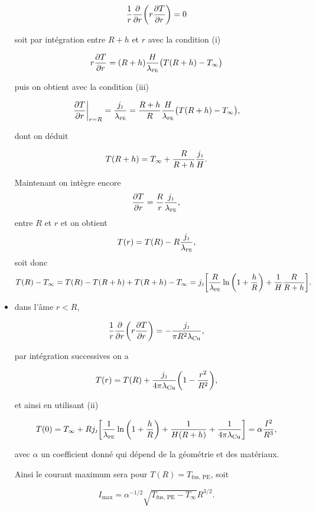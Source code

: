 \begin{solution}
\begin{questions}
\begin{itemize}
        $$\dfrac{1}{r}\pdv{r}\qty(r\pdv{T}{r}) = 0$$
        
        soit par intégration entre $R + h$ et $r$ avec la condition (i)
        
        $$r\pdv{T}{r} = (R + h) \dfrac{H}{\lambda_\textsc{pe}}\qty\big(T(R+h) - T_\infty)$$
        
        puis on obtient avec la condition (iii)
        
        $$\eval{\pdv{T}{r}}_{r = R} = \dfrac{j_\textsc{j}}{\lambda_\textsc{pe}} = \dfrac{R + h}{R} \dfrac{H}{\lambda_\textsc{pe}}\qty\big(T(R+h) - T_\infty),$$
        
        dont on déduit
        
        $$T(R+h) = T_\infty + \dfrac{R}{R + h}\dfrac{j_\textsc{j}}{H}.$$
        
        Maintenant on intègre encore
        $$\pdv{T}{r} = \dfrac{R}{r} \dfrac{j_\textsc{j}}{\lambda_\textsc{pe}},$$
        entre $R$ et $r$ et on obtient
        $$T(r) = T(R) - R \dfrac{j_\textsc{j}}{\lambda_\textsc{pe}},$$
        soit donc
        $$T(R) - T_\infty = T(R) - T(R+h) + T(R+h) - T_\infty = j_\textsc{j}\qty[\dfrac{R}{\lambda_\textsc{pe}}\ln\qty(1 + \dfrac{h}{R}) + \dfrac{1}{H}\dfrac{R}{R + h}].$$
        
        \item dans l'âme $r < R$,
        
        $$\dfrac{1}{r}\pdv{r}\qty(r\pdv{T}{r}) = -\dfrac{j_\textsc{j}}{\pi R^2 \lambda_\text{Cu}},$$
        
        par intégration successives on a
        
        $$T(r) = T(R) + \dfrac{j_\textsc{j}}{4 \pi \lambda_\text{Cu}}\qty(1 - \dfrac{r^2}{R^2}),$$
        
        et ainsi en utilisant (ii)
        
        $$T(0) = T_\infty + R j_\textsc{j}\qty[\dfrac{1}{\lambda_\textsc{pe}}\ln\qty(1 + \dfrac{h}{R}) + \dfrac{1}{H(R + h)} + \dfrac{1}{4 \pi \lambda_\text{Cu}}] = \alpha\dfrac{I^2}{R^3},$$
        
        avec $\alpha$ un coefficient donné qui dépend de la géométrie et des matériaux.
        
        Ainsi le courant maximum sera pour $T(R) = T_\text{fus, PE}$, soit
        
        $$I_\text{max} = \alpha^{-1/2}\sqrt{T_\text{fus, PE} - T_\infty} R^{3/2}.$$
        
    \end{itemize}
    
\end{questions}

\end{solution}